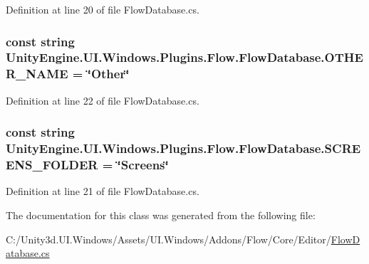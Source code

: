 Definition at line 20 of file Flow\+Database.\+cs.

\hypertarget{class_unity_engine_1_1_u_i_1_1_windows_1_1_plugins_1_1_flow_1_1_flow_database_ae3717a28b5be41c9cca3422423a3fbe7}{}
\subsubsection[{O\+T\+H\+E\+R\+\_\+\+N\+A\+M\+E}]{\setlength{\rightskip}{0pt plus 5cm}const string Unity\+Engine.\+U\+I.\+Windows.\+Plugins.\+Flow.\+Flow\+Database.\+O\+T\+H\+E\+R\+\_\+\+N\+A\+M\+E = \char`\"{}Other\char`\"{}}\label{class_unity_engine_1_1_u_i_1_1_windows_1_1_plugins_1_1_flow_1_1_flow_database_ae3717a28b5be41c9cca3422423a3fbe7}


Definition at line 22 of file Flow\+Database.\+cs.

\hypertarget{class_unity_engine_1_1_u_i_1_1_windows_1_1_plugins_1_1_flow_1_1_flow_database_a9ce5685038e2ec045c1f1c879e8dff72}{}
\subsubsection[{S\+C\+R\+E\+E\+N\+S\+\_\+\+F\+O\+L\+D\+E\+R}]{\setlength{\rightskip}{0pt plus 5cm}const string Unity\+Engine.\+U\+I.\+Windows.\+Plugins.\+Flow.\+Flow\+Database.\+S\+C\+R\+E\+E\+N\+S\+\_\+\+F\+O\+L\+D\+E\+R = \char`\"{}Screens\char`\"{}}\label{class_unity_engine_1_1_u_i_1_1_windows_1_1_plugins_1_1_flow_1_1_flow_database_a9ce5685038e2ec045c1f1c879e8dff72}


Definition at line 21 of file Flow\+Database.\+cs.



The documentation for this class was generated from the following file\+:\begin{DoxyCompactItemize}
\item 
C\+:/\+Unity3d.\+U\+I.\+Windows/\+Assets/\+U\+I.\+Windows/\+Addons/\+Flow/\+Core/\+Editor/\hyperlink{_flow_database_8cs}{Flow\+Database.\+cs}\end{DoxyCompactItemize}
